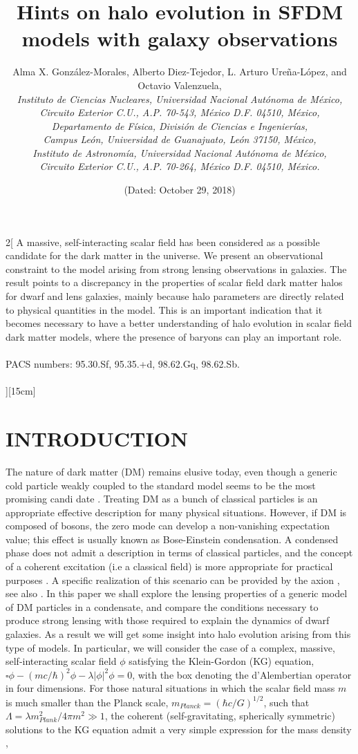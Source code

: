 \documentclass[letterpaper,10pt]{article}
\title{\large\bfseries{Hints on halo evolution in SFDM models with galaxy observations}}
\author{
\small{Alma X. González-Morales, Alberto Diez-Tejedor,  L. Arturo Ureña-López, and Octavio Valenzuela,} \\ 
\textit{\small{Instituto de Ciencias Nucleares, Universidad Nacional Autónoma de México,}} \\ 
\textit{\small{Circuito Exterior C.U., A.P. 70-543, México D.F. 04510, México,}} \\ \textit{\small{Departamento de Física, División de Ciencias e Ingenierías,}} \\ \textit{\small{Campus León, Universidad de Guanajuato, León 37150, México,}} \\ \textit{\small{Instituto de Astronomía, Universidad Nacional Autónoma de México,}} \\ \textit{\small{Circuito Exterior C.U., A.P. 70-264, México D.F. 04510, México.}}
}
\date{\small{(Dated: October 29, 2018)}}
\begin{document}
\maketitle
\begin{multicols}{2}[
\thispagestyle{empty}
\small{A massive, self-interacting scalar field has been considered as a possible candidate for the dark matter in the universe. We present an observational constraint to the model arising from strong lensing observations in galaxies. The result points to a discrepancy in the properties of scalar field dark matter halos for dwarf and lens galaxies, mainly because halo parameters are directly related to physical quantities in the model. This is an important indication that it becomes necessary to have a better understanding of halo evolution in scalar field dark matter models, where the presence of baryons can play an important role.\\ \\
PACS numbers: 95.30.Sf, 95.35.+d, 98.62.Gq, 98.62.Sb.}
\\\\ ][15cm]  
\small{\section{INTRODUCTION}}
\small{The nature of dark matter (DM) remains elusive today, even though a generic cold particle weakly coupled to the standard model seems to be the most promising candi date \cite{Bertone_2005}. Treating DM as a bunch of classical particles is an appropriate effective description for many physical situations. However, if DM is composed of bosons, the zero mode can develop a non-vanishing expectation value; this effect is usually known as Bose-Einstein condensation. A condensed phase does not admit a description in terms of classical particles, and the concept of a coherent excitation (i.e a classical field) is more appropriate for practical purposes \cite{Matos_2001}. A specific realization of this scenario can be provided by the axion \cite{Sikivie_2009}, see also \cite{B_hm_2004}.
In this paper we shall explore the lensing properties of a generic model of DM particles in a condensate, and compare the conditions necessary to produce strong lensing with those required to explain the dynamics of dwarf galaxies. As a result we will get some insight into halo evolution arising from this type of models. 
In particular, we will consider the case of a complex, massive, self-interacting scalar field $\phi$ satisfying the Klein-Gordon (KG) equation, $\square\phi - (mc/ \hbar)^2\phi -\lambda \vert \phi \vert ^2 \phi = 0$, with the box denoting the d’Alembertian operator in four dimensions. For those natural situations in which the scalar field mass $m$ is much smaller than the Planck scale, $m_{Planck}=(\hbar c/G)^{1/2}$, such that $\Lambda=\lambda m_{Plank}^2 /4\pi m^2 \gg 1$, the coherent (self-gravitating, spherically symmetric) solutions to the KG equation admit a very simple expression for the mass density \cite{Lee_1996, Arbey_2003},

}
\end{multicols}
\end{document}
